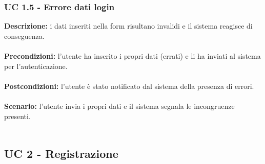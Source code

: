 \documentclass[a4paper,11pt]{article}
\begin{document}
\subsubsection{UC 1.5 - Errore dati login}

\textbf{Descrizione:} i dati inseriti nella form risultano invalidi e il sistema reagisce di conseguenza.\\
\\
\textbf{Precondizioni:} l'utente ha inserito i propri dati (errati) e li ha inviati al sistema per l'autenticazione.\\
\\
\textbf{Postcondizioni:} l’utente è stato notificato dal sistema della presenza di errori.\\
\\
\textbf{Scenario:} l’utente invia i propri dati e il sistema segnala le incongruenze presenti.\\
\\

\newpage
\subsection{UC 2 - Registrazione}
\end{document}
